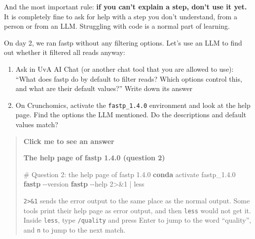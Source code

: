\documentclass[
  letterpaper,
  DIV=11,
  numbers=noendperiod]{scrreprt}
\newenvironment{Shaded}{}{}
\newcommand{\AttributeTok}[1]{\textcolor[rgb]{0.84,0.23,0.29}{#1}}
\newcommand{\CommentTok}[1]{\textcolor[rgb]{0.42,0.45,0.49}{#1}}
\newcommand{\DecValTok}[1]{\textcolor[rgb]{0.00,0.36,0.77}{#1}}
\newcommand{\ExtensionTok}[1]{\textcolor[rgb]{0.84,0.23,0.29}{\textbf{#1}}}
\newcommand{\FunctionTok}[1]{\textcolor[rgb]{0.44,0.26,0.76}{#1}}
\newcommand{\KeywordTok}[1]{\textcolor[rgb]{0.84,0.23,0.29}{#1}}
\newcommand{\NormalTok}[1]{\textcolor[rgb]{0.14,0.16,0.18}{#1}}
\newcommand{\OperatorTok}[1]{\textcolor[rgb]{0.14,0.16,0.18}{#1}}
\providecommand{\tightlist}{%
  \setlength{\itemsep}{0pt}\setlength{\parskip}{0pt}}
\begin{document}
And the most important rule: \textbf{if you can't explain a step, don't
use it yet.} It is completely fine to ask for help with a step you don't
understand, from a person or from an LLM. Struggling with code is a
normal part of learning.

\begin{tcolorbox}[enhanced jigsaw, title=\textcolor{quarto-callout-color}{\faInfo}\hspace{0.5em}{Exercise}, rightrule=.15mm, titlerule=0mm, colframe=quarto-callout-color-frame, toprule=.15mm, leftrule=.75mm, colbacktitle=quarto-callout-color!10!white, bottomtitle=1mm, toptitle=1mm, arc=.35mm, opacitybacktitle=0.6, left=2mm, bottomrule=.15mm, breakable, opacityback=0, colback=white, coltitle=black]

On day 2, we ran fastp without any filtering options. Let's use an LLM
to find out whether it filtered all reads anyway:

\begin{enumerate}
\def\labelenumi{\arabic{enumi}.}
\tightlist
\item
  Ask in UvA AI Chat (or another chat tool that you are allowed to use):
  ``What does fastp do by default to filter reads? Which options control
  this, and what are their default values?'' Write down its answer
\item
  On Crunchomics, activate the \texttt{fastp\_1.4.0} environment and
  look at the help page. Find the options the LLM mentioned. Do the
  descriptions and default values match?
\end{enumerate}

\begin{quote}
\textbf{Click me to see an answer}

\textbf{The help page of fastp 1.4.0 (question 2)}

\begin{Shaded}
\begin{Highlighting}[]
\CommentTok{\# Question 2: the help page of fastp 1.4.0}
\ExtensionTok{conda}\NormalTok{ activate fastp\_1.4.0}
\ExtensionTok{fastp} \AttributeTok{{-}{-}version}
\ExtensionTok{fastp} \AttributeTok{{-}{-}help} \DecValTok{2}\OperatorTok{\textgreater{}\&}\DecValTok{1} \KeywordTok{|} \FunctionTok{less}
\end{Highlighting}
\end{Shaded}

\texttt{2\textgreater{}\&1} sends the error output to the same place as
the normal output. Some tools print their help page as error output, and
then \texttt{less} would not get it. Inside \texttt{less}, type
\texttt{/quality} and press Enter to jump to the word ``quality'', and
\texttt{n} to jump to the next match.


\end{quote}
\end{tcolorbox}
\end{document}
